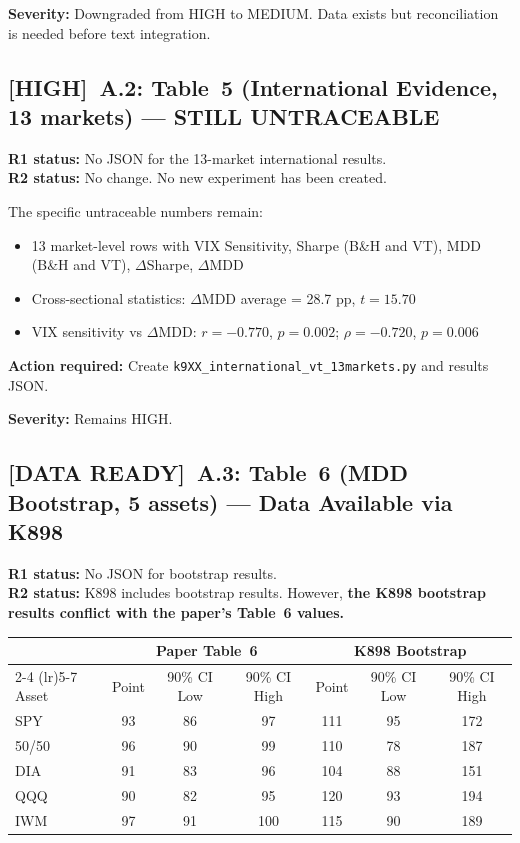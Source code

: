\documentclass[12pt,a4paper]{article}
\newcommand{\HIGH}{\textcolor{highsev}{\textbf{[HIGH]}}}
\newcommand{\DATAREADY}{\textcolor{fixedblue}{\textbf{[DATA READY]}}}
\begin{document}
\textbf{Severity:} \textcolor{fixedblue}{Downgraded from HIGH to MEDIUM.} Data exists but reconciliation is needed before text integration.

\bigskip


\subsection{\HIGH\ A.2: Table~5 (International Evidence, 13 markets) --- STILL UNTRACEABLE}

\textbf{R1 status:} No JSON for the 13-market international results.\\
\textbf{R2 status:} \textcolor{highsev}{No change.} No new experiment has been created.

The specific untraceable numbers remain:
\begin{itemize}[nosep]
\item 13 market-level rows with VIX Sensitivity, Sharpe (B\&H and VT), MDD (B\&H and VT), $\Delta$Sharpe, $\Delta$MDD
\item Cross-sectional statistics: $\Delta$MDD average = 28.7 pp, $t = 15.70$
\item VIX sensitivity vs $\Delta$MDD: $r = -0.770$, $p = 0.002$; $\rho = -0.720$, $p = 0.006$
\end{itemize}

\textbf{Action required:} Create \texttt{k9XX\_international\_vt\_13markets.py} and results JSON.

\textbf{Severity:} \textcolor{highsev}{Remains HIGH.}

\bigskip


\subsection{\DATAREADY\ A.3: Table~6 (MDD Bootstrap, 5 assets) --- Data Available via K898}

\textbf{R1 status:} No JSON for bootstrap results.\\
\textbf{R2 status:} K898 includes bootstrap results. However, \textbf{the K898 bootstrap results conflict with the paper's Table~6 values.}

\begin{center}
\small
\begin{tabular}{lcccccc}
\toprule
& \multicolumn{3}{c}{Paper Table~6} & \multicolumn{3}{c}{K898 Bootstrap} \\
\cmidrule(lr){2-4} \cmidrule(lr){5-7}
Asset & Point & 90\% CI Low & 90\% CI High & Point & 90\% CI Low & 90\% CI High \\
\midrule
SPY  & 93  & 86 & 97  & 111 & 95  & 172 \\
50/50 & 96 & 90 & 99  & 110 & 78  & 187 \\
DIA  & 91  & 83 & 96  & 104 & 88  & 151 \\
QQQ  & 90  & 82 & 95  & 120 & 93  & 194 \\
IWM  & 97  & 91 & 100 & 115 & 90  & 189 \\
\bottomrule
\end{tabular}
\end{center}
\end{document}
